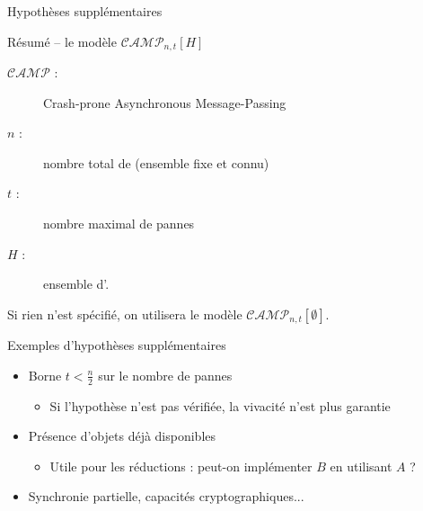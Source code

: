 
\begingroup

\begin{frame}{Hypothèses supplémentaires}
  
  \begin{block}{Résumé -- le modèle $\mathcal{CAMP}_{n,t}[H]$}
    \begin{description}
    \item[$\mathcal{CAMP}$ :] Crash-prone Asynchronous Message-Passing
    \item[$n$ :] nombre total de  (ensemble fixe et connu)
    \item[$t$ :] nombre maximal de pannes 
    \item[$H$ :] ensemble d'. 
    \end{description}
  \end{block}
  
  Si rien n'est spécifié, on utilisera le modèle \alert{$\mathcal{CAMP}_{n,t}[\emptyset]$}.

  \vspace{4mm}
  
  \begin{exampleblock}{Exemples d'hypothèses supplémentaires}
    \begin{itemize}
    \item Borne \alert{$t < \frac{n}{2}$} sur le nombre de pannes
      \begin{itemize}
      \item Si l'hypothèse n'est pas vérifiée, la vivacité n'est plus garantie
      \end{itemize}
    \item Présence d'\alert{objets déjà disponibles}
      \begin{itemize}
      \item Utile pour les réductions : peut-on implémenter $B$ en utilisant $A$ ? 
      \end{itemize}
    \item Synchronie partielle, capacités cryptographiques...
    \end{itemize}
  \end{exampleblock}

\end{frame}

\endgroup
\endinput
